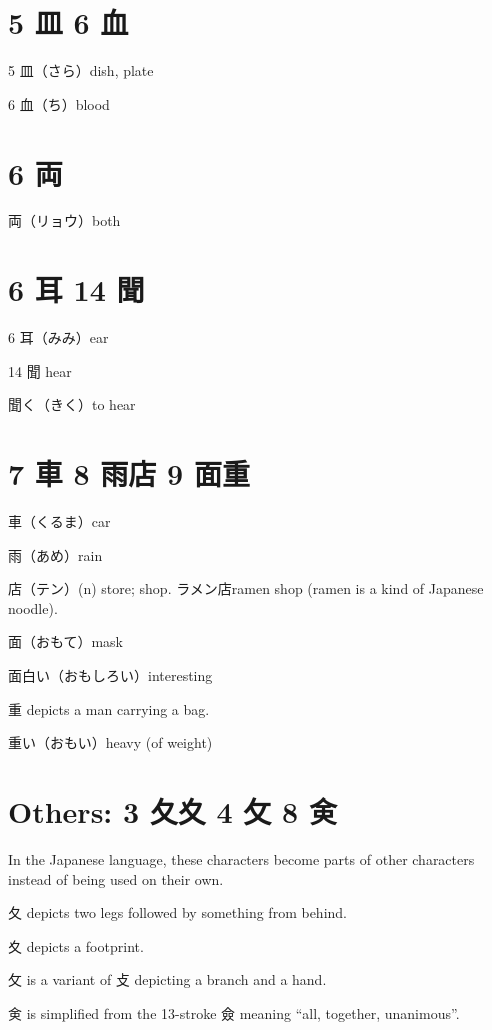 \section{5 皿 6 血}

5 皿（さら）dish, plate

6 血（ち）blood

\section{6 両}

両（リョウ）both

\section{6 耳 14 聞}

6 耳（みみ）ear

14 聞 hear

聞く（きく）to hear

\section{7 車 8 雨店 9 面重}

車（くるま）car

雨（あめ）rain

店（テン）(n) store; shop.
ラメン店ramen shop (ramen is a kind of Japanese noodle).

面（おもて）mask

面白い（おもしろい）interesting

重 depicts a man carrying a bag.

重い（おもい）heavy (of weight)

\section{Others: 3 夂夊 4 攵 8 㑒}

In the Japanese language,
these characters become parts of other characters
instead of being used on their own.

夂 depicts two legs followed by something from behind.

夊 depicts a footprint.

攵 is a variant of 攴 depicting a branch and a hand.

㑒 is simplified from the 13-stroke 僉
meaning ``all, together, unanimous''.
